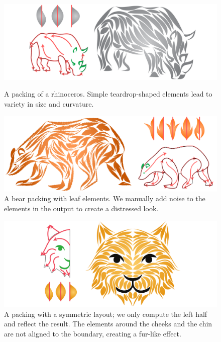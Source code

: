 \begin{figure}
\centering
\includegraphics[width=1.0\textwidth]{figures/flowpak/result_02.pdf} %
\caption[A packing of a rhinoceros]
{\label{result_rhino}
A packing of a rhinoceros.  Simple teardrop-shaped 
elements lead to variety in size and curvature.}
\bigskip
\includegraphics[width=1.0\textwidth]{figures/flowpak/bear_leaves.pdf} %
\caption[A packing of a bear with leaf elements]
{\label{result_bear_leaves}
  A bear packing with leaf elements.  We manually add noise to the 
  elements in the output to create a distressed look.}
\end{figure}

\begin{figure}
\centering
\includegraphics[width=1.0\textwidth]{figures/flowpak/cat.pdf}
\caption[A packing of a cat]
{A packing with a symmetric layout; we only compute the left half and reflect the result. The elements around the cheeks and the chin are not aligned to the boundary, creating a fur-like effect.}
\label{result_cat}
\end{figure}

